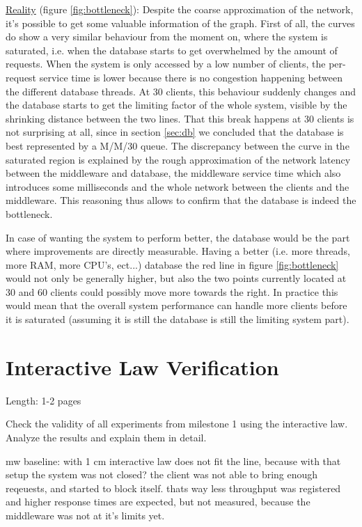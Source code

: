 \documentclass[11pt]{article}
\begin{document}
\newline\underline{Reality} (figure \ref{fig:bottleneck}): Despite the coarse approximation of the network, it's possible to get some valuable information of the graph. First of all, the curves do show a very similar behaviour from the moment on, where the system is saturated, i.e. when the database starts to get overwhelmed by the amount of requests. When the system is only accessed by a low number of clients, the per-request service time is lower because there is no congestion happening between the different database threads. At 30 clients, this behaviour suddenly changes and the database starts to get the limiting factor of the whole system, visible by the shrinking distance between the two lines. That this break happens at 30 clients is not surprising at all, since in section \ref{sec:db} we concluded that the database is best represented by a M/M/30 queue. The discrepancy between the curve in the saturated region is explained by the rough approximation of the network latency between the middleware and database, the middleware service time which also introduces some milliseconds and the whole network between the clients and the middleware. This reasoning thus allows to confirm that the database is indeed the bottleneck.

In case of wanting the system to perform better, the database would be the part where improvements are directly measurable. Having a better (i.e. more threads, more RAM, more CPU's, ect...) database the red line in figure \ref{fig:bottleneck} would not only be generally higher, but also the two points currently located at 30 and 60 clients could possibly move more towards the right. In practice this would mean that the overall system performance can handle more clients before it is saturated (assuming it is still the database is still the limiting system part).

\section{Interactive Law Verification}\label{sec:interactive-law}

Length: 1-2 pages

Check the validity of all experiments from milestone 1 using the interactive law. Analyze the results and explain them in detail.

mw baseline: with 1 cm interactive law does not fit the line, because with that setup the system was not closed? the client was not able to bring enough reqeuests, and started to block itself. thats way less throughput was registered and higher response times are expected, but not measured, because the middleware was not at it's limits yet.
\end{document}
